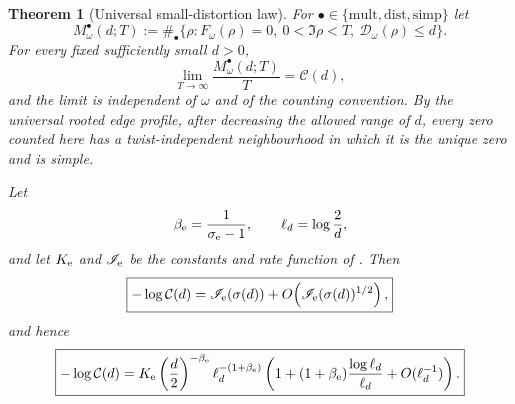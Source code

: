 \documentclass[11pt]{article}
\newtheorem{theorem}{Theorem}[section]
\theoremstyle{definition}
\theoremstyle{remark}
\begin{document}
\begin{theorem}[Universal small-distortion law]
\label{thm:small-distortion-law}
For $\bullet\in\{\mathrm{mult},\mathrm{dist},\mathrm{simp}\}$ let
\[
 M_\omega^\bullet(d;T)
 :=\#_\bullet\{\rho:F_\omega(\rho)=0,\ 0<\Im\rho<T,
                         \ \mathcal D_\omega(\rho)\leq d\}.
\]
For every fixed sufficiently small $d>0$,
\begin{equation}
\label{eq:distortion-counting-law}
 \boxed{
 \lim_{T\to\infty}\frac{M_\omega^\bullet(d;T)}{T}=\mathcal C(d),
 }
\end{equation}
and the limit is independent of $\omega$ and of the counting convention.
By the universal rooted edge profile, after decreasing the allowed range of
$d$, every zero counted here has a twist-independent neighbourhood in which it
is the unique zero and is simple.

Let
\[
 \beta_{\rm e}=\frac1{\sigma_{\rm e}-1},
 \qquad \ell_d=\log\frac2d,
\]
and let $K_{\rm e}$ and $\mathscr I_{\rm e}$ be the constants and rate
function of .  Then
\begin{equation}
\label{eq:integrated-rate-sharp}
 \boxed{
 -\log\mathcal C(d)
 =\mathscr I_{\rm e}(\sigma(d))
  +O\!\left(\mathscr I_{\rm e}(\sigma(d))^{1/2}\right),
 }
\end{equation}
and hence
\begin{equation}
\label{eq:integrated-distortion-profile}
 \boxed{
 -\log\mathcal C(d)
 =K_{\rm e}\left(\frac d2\right)^{-\beta_{\rm e}}
  \ell_d^{-(1+\beta_{\rm e})}
 \left(
  1+(1+\beta_{\rm e})\frac{\log\ell_d}{\ell_d}
  +O(\ell_d^{-1})
 \right).
 }
\end{equation}
\end{theorem}
\end{document}
